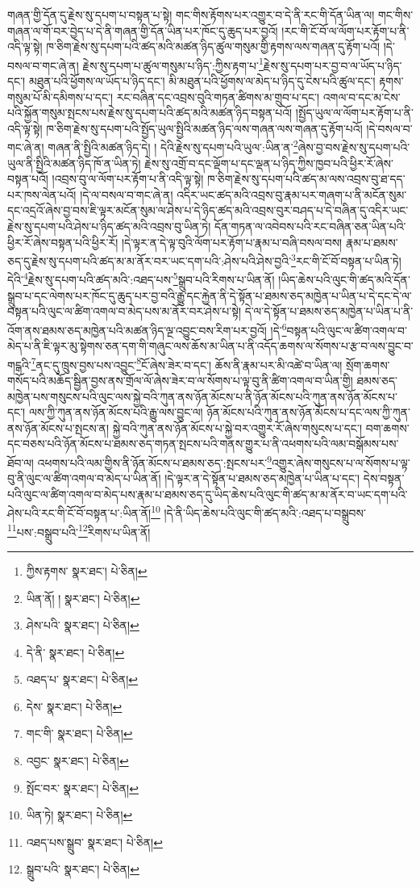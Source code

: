 གཞན་གྱི་དོན་དུ་རྗེས་སུ་དཔག་པ་བསྟན་པ་སྟེ། གང་གིས་རྟོགས་པར་འགྱུར་བ་དེ་ནི་རང་གི་དོན་ཡིན་ལ། གང་གིས་གཞན་ལ་གོ་བར་བྱེད་པ་དེ་ནི་གཞན་གྱི་དོན་ཡིན་པར་ཁོང་དུ་ཆུད་པར་བྱའོ། །རང་གི་ངོ་བོ་ལ་ལོག་པར་རྟོག་པ་ནི་འདི་ལྟ་སྟེ། ཁ་ཅིག་རྗེས་སུ་དཔག་པའི་ཚད་མའི་མཚན་ཉིད་ཚུལ་གསུམ་གྱི་རྟགས་ལས་གཞན་དུ་རྟོག་པའོ། །དེ་བསལ་བ་གང་ཞེ་ན། རྗེས་སུ་དཔག་པ་ཚུལ་གསུམ་པ་ཉིད་:ཀྱིས་རྟག་པ་\footnote{ཀྱིས་རྟགས་  སྣར་ཐང་།  པེ་ཅིན། }རྗེས་སུ་དཔག་པར་བྱ་བ་ལ་ཡོད་པ་ཉིད་དང་། མཐུན་པའི་ཕྱོགས་ལ་ཡོད་པ་ཉིད་དང་། མི་མཐུན་པའི་ཕྱོགས་ལ་མེད་པ་ཉིད་དུ་ངེས་པའི་ཚུལ་དང་། རྟགས་གསུམ་པོ་མི་དམིགས་པ་དང་། རང་བཞིན་དང་འབྲས་བུའི་གཏན་ཚིགས་མ་གྲུབ་པ་དང་། འགལ་བ་དང་མ་ངེས་པའི་སྐྱོན་གསུམ་སྤངས་པས་རྗེས་སུ་དཔག་པའི་ཚད་མའི་མཚན་ཉིད་བསྟན་པའོ། །སྤྱོད་ཡུལ་ལ་ལོག་པར་རྟོག་པ་ནི་འདི་ལྟ་སྟེ། ཁ་ཅིག་རྗེས་སུ་དཔག་པའི་སྤྱོད་ཡུལ་སྤྱིའི་མཚན་ཉིད་ལས་གཞན་ལས་གཞན་དུ་རྟོག་པའོ། །དེ་བསལ་བ་གང་ཞེ་ན། གཞན་ནི་སྤྱིའི་མཚན་ཉིད་དེ། །
དེའི་རྗེས་སུ་དཔག་པའི་ཡུལ་:ཡིན་ན་\footnote{ཡིན་ནོ། །  སྣར་ཐང་།  པེ་ཅིན། }ཞེས་བྱ་བས་རྗེས་སུ་དཔག་པའི་ཡུལ་ནི་སྤྱིའི་མཚན་ཉིད་ཁོ་ན་ཡིན་ཏེ། རྗེས་སུ་འགྲོ་བ་དང་ལྡོག་པ་དང་ལྡན་པ་ཉིད་ཀྱིས་ཁྱབ་པའི་ཕྱིར་རོ་ཞེས་བསྟན་པའོ། །འབྲས་བུ་ལ་ལོག་པར་རྟོག་པ་ནི་འདི་ལྟ་སྟེ། ཁ་ཅིག་རྗེས་སུ་དཔག་པའི་ཚད་མ་ལས་འབྲས་བུ་ཐ་དད་པར་ཁས་ལེན་པའོ། །དེ་ལ་བསལ་བ་གང་ཞེ་ན། འདིར་ཡང་ཚད་མའི་འབྲས་བུ་རྣམ་པར་གཞག་པ་ནི་མངོན་སུམ་དང་འདྲའོ་ཞེས་བྱ་བས་ཇི་ལྟར་མངོན་སུམ་ལ་ཤེས་པ་དེ་ཉིད་ཚད་མའི་འབྲས་བུར་བཤད་པ་དེ་བཞིན་དུ་འདིར་ཡང་རྗེས་སུ་དཔག་པའི་ཤེས་པ་ཉིད་ཚད་མའི་འབྲས་བུ་ཡིན་ཏེ། དོན་གཏན་ལ་འབེབས་པའི་རང་བཞིན་ཅན་ཡིན་པའི་ཕྱིར་རོ་ཞེས་བསྟན་པའི་ཕྱིར་རོ། །དེ་ལྟར་ན་དེ་ལྟ་བུའི་ལོག་པར་རྟོག་པ་རྣམ་པ་བཞི་བསལ་བས། རྣམ་པ་ཐམས་ཅད་དུ་རྗེས་སུ་དཔག་པའི་ཚད་མ་མ་ནོར་བར་ཡང་དག་པའི་:ཤེས་པའི་ཤེས་བྱའི་\footnote{ཤེས་པའི་  སྣར་ཐང་།  པེ་ཅིན། }རང་གི་ངོ་བོ་བསྟན་པ་ཡིན་ཏེ། དེའི་\footnote{དེ་ནི་  སྣར་ཐང་།  པེ་ཅིན། }རྗེས་སུ་དཔག་པའི་ཚད་མའི་:འཐད་པས་\footnote{འཐད་པ་  སྣར་ཐང་།  པེ་ཅིན། }སྒྲུབ་པའི་རིགས་པ་ཡིན་ནོ། །ཡིད་ཆེས་པའི་ལུང་གི་ཚད་མའི་དོན་སྒྲུབ་པ་དང་ལེགས་པར་ཁོང་དུ་ཆུད་པར་བྱ་བའི་རྒྱུ་དང་རྐྱེན་ནི་དེ་སྟོན་པ་ཐམས་ཅད་མཁྱེན་པ་ཡིན་པ་དེ་དང་དེ་ལ་བསྟན་པའི་ལུང་ལ་ཚིག་འགལ་བ་མེད་པས་མ་ནོར་བར་ཤེས་པ་སྟེ། དེ་ལ་དེ་སྟོན་པ་ཐམས་ཅད་མཁྱེན་པ་ཡིན་པ་ནི་འོག་ནས་ཐམས་ཅད་མཁྱེན་པའི་མཚན་ཉིད་ལྔ་འབྱུང་བས་རིག་པར་བྱའོ། །དེ་\footnote{དེས་  སྣར་ཐང་།  པེ་ཅིན། }བསྟན་པའི་ལུང་ལ་ཚིག་འགལ་བ་མེད་པ་ནི་ཇི་ལྟར་མུ་སྟེགས་ཅན་དག་གི་གཞུང་ལས་ཆོས་མ་ཡིན་པ་ནི་འདོད་ཆགས་ལ་སོགས་པ་རྩ་བ་ལས་བྱུང་བ་གངྒའི་\footnote{གང་གི་  སྣར་ཐང་།  པེ་ཅིན། }ནང་དུ་ཁྲུས་བྱས་པས་འབྱུང་\footnote{འབྱང་  སྣར་ཐང་།  པེ་ཅིན། }ངོ་ཞེས་ཟེར་བ་དང་། ཆོས་ནི་རྣམ་པར་མི་འཚེ་བ་ཡིན་ལ། སྲོག་ཆགས་གསོད་པའི་མཆོད་སྦྱིན་བྱས་ནས་གྲོལ་ལོ་ཞེས་ཟེར་བ་ལ་སོགས་པ་ལྟ་བུ་ནི་ཚིག་འགལ་བ་ཡིན་གྱི། ཐམས་ཅད་མཁྱེན་པས་གསུངས་པའི་ལུང་ལས་སྐྱེ་བའི་ཀུན་ནས་ཉོན་མོངས་པ་ནི་ཉོན་མོངས་པའི་ཀུན་ནས་ཉོན་མོངས་པ་དང་། ལས་ཀྱི་ཀུན་ནས་ཉོན་མོངས་པའི་རྒྱུ་ལས་བྱུང་ལ། ཉོན་མོངས་པའི་ཀུན་ནས་ཉོན་མོངས་པ་དང་ལས་ཀྱི་ཀུན་ནས་ཉོན་མོངས་པ་སྤངས་ན། སྐྱེ་བའི་ཀུན་ནས་ཉོན་མོངས་པ་སྐྱེ་བར་འགྱུར་རོ་ཞེས་གསུངས་པ་དང་། བག་ཆགས་དང་བཅས་པའི་ཉོན་མོངས་པ་ཐམས་ཅད་གཏན་སྤངས་པའི་གནས་གྱུར་པ་ནི་འཕགས་པའི་ལམ་བསྒོམས་པས་ཐོབ་ལ། འཕགས་པའི་ལམ་གྱིས་ནི་ཉོན་མོངས་པ་ཐམས་ཅད་:སྤངས་པར་\footnote{སྤོང་བར་  སྣར་ཐང་།  པེ་ཅིན། }འགྱུར་ཞེས་གསུངས་པ་ལ་སོགས་པ་ལྟ་བུ་ནི་ལུང་ལ་ཚིག་འགལ་བ་མེད་པ་ཡིན་ནོ། །དེ་ལྟར་ན་དེ་སྟོན་པ་ཐམས་ཅད་མཁྱེན་པ་ཡིན་པ་དང་། དེས་བསྟན་པའི་ལུང་ལ་ཚིག་འགལ་བ་མེད་པས་རྣམ་པ་ཐམས་ཅད་དུ་ཡིད་ཆེས་པའི་ལུང་གི་ཚད་མ་མ་ནོར་བ་ཡང་དག་པའི་ཤེས་པའི་རང་གི་ངོ་བོ་བསྟན་པ་:ཡིན་ནོ།\footnote{ཡིན་ཏེ།  སྣར་ཐང་།  པེ་ཅིན། } །དེ་ནི་ཡིད་ཆེས་པའི་ལུང་གི་ཚད་མའི་:འཐད་པ་བསྒྲུབས་\footnote{འཐད་པས་སྒྲུབ་  སྣར་ཐང་།  པེ་ཅིན། }པས་:བསྒྲུབ་པའི་\footnote{སྒྲུབ་པའི་  སྣར་ཐང་།  པེ་ཅིན། }རིགས་པ་ཡིན་ནོ། 